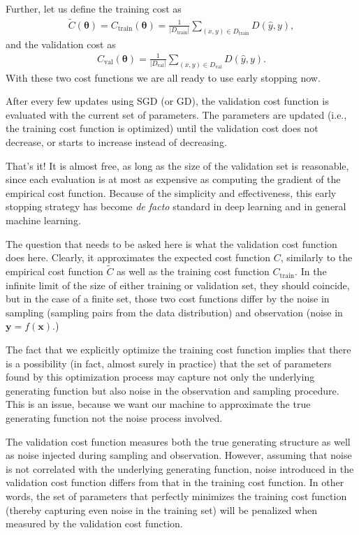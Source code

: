 \documentclass{report}
\newcommand{\vect}[1]{\mathbf{#1}}
\newcommand{\vects}[1]{\boldsymbol{#1}}
\newcommand{\vx}[0]{\vect{x}}
\newcommand{\vy}[0]{\vect{y}}
\newcommand{\TT}[0]{\vects{\theta}}
\newcommand{\train}{\text{train}}
\newcommand{\val}{\text{val}}
\begin{document}
Further, let us define the training cost as
\begin{align}
    \label{eq:train_c}
    \tilde{C}(\TT) = C_{\train}(\TT) = \frac{1}{|D_{\train}|} \sum_{(x,y) \in
    D_{\train}} D(\hat{y}, y),
\end{align}
and the validation cost as
\begin{align}
    \label{eq:val_c}
    C_{\val}(\TT) = \frac{1}{|D_{\val}|} \sum_{(x,y) \in D_{\val}} D(\hat{y}, y).
\end{align}
With these two cost functions we are all ready to use early stopping now. 

After every few updates using SGD (or GD), the validation cost function is
evaluated with the current set of parameters. The parameters are updated (i.e.,
the training cost function is optimized) until the validation cost does not
decrease, or starts to increase instead of decreasing.

That's it! It is almost free, as long as the size of the validation set is
reasonable, since each evaluation is at most as expensive as computing the
gradient of the empirical cost function. Because of the simplicity and
effectiveness, this early stopping strategy has become {\em de facto} standard
in deep learning and in general machine learning.

The question that needs to be asked here is what the validation cost function
does here. Clearly, it approximates the expected cost function $C$, similarly to
the empirical cost function $\tilde{C}$ as well as the training cost function
$C_{\train}$. In the infinite limit of the size of either training or validation
set, they should coincide, but in the case of a finite set, those two cost
functions differ by the noise in sampling (sampling pairs from the data
distribution) and observation (noise in $\vy=f(\vx)$.)

The fact that we explicitly optimize the training cost function implies that
there is a possibility (in fact, almost surely in practice) that the set of
parameters found by this optimization process may capture not only the
underlying generating function but also noise in the observation and sampling
procedure. This is an issue, because we want our machine to approximate the true
generating function not the noise process involved. 

The validation cost function measures both the true generating structure as well
as noise injected during sampling and observation. However, assuming that noise
is not correlated with the underlying generating function, noise introduced in
the validation cost function differs from that in the training cost function. In
other words, the set of parameters that perfectly minimizes the training cost
function (thereby capturing even noise in the training set) will be penalized
when measured by the validation cost function. 
\end{document}
